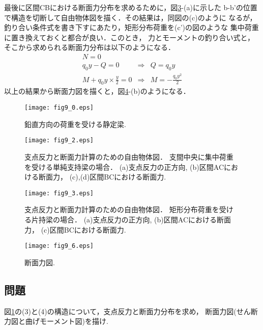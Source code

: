 \documentclass[10pt,a4j]{jbook}
\begin{document}
\begin{enumerate}
最後に区間CBにおける断面力分布を求めるために，図\ref{fig:fig9_3}-(a)に示した
b-b'の位置で構造を切断して自由物体図を描く．その結果は，同図の(c)のように
なるが，釣り合い条件式を書き下すにあたり，矩形分布荷重を(c')の図のような
集中荷重に置き換えておくと都合が良い．このとき，
力とモーメントの釣り合い式と，そこから求められる断面力分布は以下のようになる．
\begin{eqnarray}
	N=0 & & 
	\label{eqn:}
	\\
	q_0y -Q=0 & \Rightarrow & Q=q_0y 
	\label{eqn:}
	\\
	M+q_0y\times \frac{y}{2} =0 & \Rightarrow & M=-\frac{q_0y^2}{2}
	\label{eqn:}
\end{eqnarray}
以上の結果から断面力図を描くと，図\ref{fig:fig9_6}-(b)のようになる．
\end{enumerate}
\begin{figure}
	\begin{center}
	\texttt{[image: fig9\_0.eps]} 
	\end{center}
	\caption{
		鉛直方向の荷重を受ける静定梁.
	} 
	\label{fig:fig9_0}
\end{figure}
\begin{figure}
	\begin{center}
	\texttt{[image: fig9\_2.eps]} 
	\end{center}
	\caption{
		支点反力と断面力計算のための自由物体図．
		支間中央に集中荷重を受ける単純支持梁の場合．
		(a)支点反力の正方向, (b)区間ACにおける断面力，
		(c),(d)区間BCにおける断面力. 
	} 
	\label{fig:fig9_2}
\end{figure}
\begin{figure}
	\begin{center}
	\texttt{[image: fig9\_3.eps]} 
	\end{center}
	\caption{
		支点反力と断面力計算のための自由物体図．
		矩形分布荷重を受ける片持梁の場合．
		(a)支点反力の正方向, (b)区間ACにおける断面力，
		(c)区間BCにおける断面力. 
	} 
	\label{fig:fig9_3}
\end{figure}
\begin{figure}
	\begin{center}
	\texttt{[image: fig9\_6.eps]} 
	\end{center}
	\caption{
		断面力図. 
	} 
	\label{fig:fig9_6}
\end{figure}
\subsection{問題}
図\ref{fig:fig9_0}の(3)と(4)の構造について，支点反力と断面力分布を求め，
断面力図(せん断力図と曲げモーメント図)を描け. 
\end{document}
